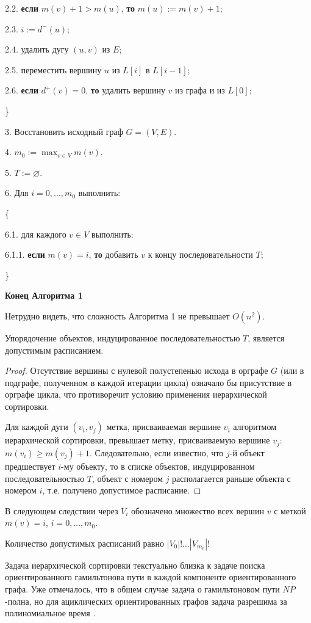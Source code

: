 		2.2. \textbf{ если} $m(v)+1>m(u)$, \textbf{ то} $m(u):=m(v)+1$;
		
		2.3. $i:=d^-(u)$;
		
		2.4. удалить дугу $(u,v)$ из $E$;
		
		2.5. переместить вершину $u$ из $L[i]$ в $L[i-1]$;
		
		2.6. \textbf{ если} $d^+(v)=0$, \textbf{ то} удалить вершину $v$ из графа и из $L[0]$;
	
\}

3. Восстановить исходный граф ${G=(V,E)}$.

4. ${m_0:=\max_{v\in V} m(v)}$.

5. $T:=\varnothing$.

6. Для $i=0,\dots, m_0$ выполнить:

\{

6.1. для каждого $v\in V$ выполнить:

6.1.1. \textbf{ если} $m(v)=i$, \textbf{ то} добавить $v$ к концу последовательности $T$;

\}

\textbf{ Конец Алгоритма 1}
\par\medskip
Нетрудно видеть, что сложность Алгоритма 1 не превышает $O(n^2)$.

\begin{state}\label{state1} Упорядочение объектов, индуцированное последовательностью $T$, является допустимым расписанием.
\end{state}
\begin{proof}
 Отсутствие вершины с нулевой полустепенью исхода в орграфе $G$ (или в подграфе, полученном в каждой итерации цикла) означало бы присутствие в орграфе цикла, что противоречит условию применения иерархической сортировки.

Для каждой дуги $(v_i,v_j)$ метка, присваиваемая вершине $v_i$ алгоритмом иерархической сортировки, превышает метку, присваиваемую вершине $v_j$:\ ${m(v_i)\geq m(v_j)+1}$. Следовательно, если известно, что $j$-й объект предшествует $i$-му объекту, то в списке объектов, индуцированном последовательностью $T$, объект с номером $j$ располагается раньше объекта с номером $i$, т.е. получено допустимое расписание.
\end{proof}
В следующем следствии через $V_i$ обозначено множество всех вершин $v$ с меткой ${m(v)=i}$, ${i=0,\dots, m_0}$.
\begin{corollary}
Количество допустимых расписаний равно $|V_0|!\dots|V_{m_0}|!$
\end{corollary}
\begin{remark}
Задача иерархической сортировки текстуально близка к задаче поиска ориентированного гамильтонова пути в каждой компоненте ориентированного графа. Уже отмечалось, что в общем случае задача о гамильтоновом пути $NP$-полна, но для ациклических ориентированных графов задача разрешима за полиномиальное время \cite{akm-14Lawler}.
\end{remark}

